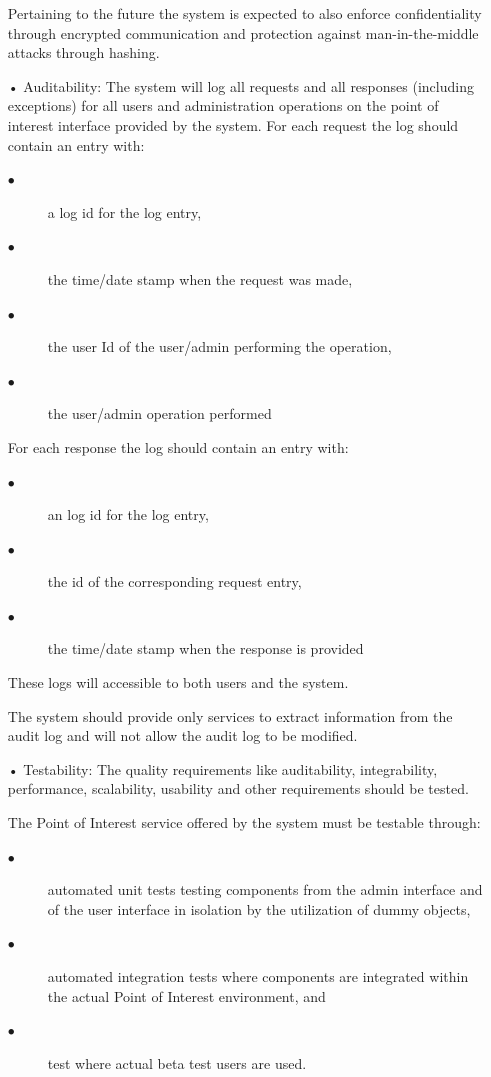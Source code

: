 \documentclass[runningheads,a4paper]{article}
\begin{document}
\begin{enumerate}
Pertaining to the future the system is expected to also enforce confidentiality through encrypted communication and protection against man-in-the-middle attacks through hashing.

\item[•]Auditability: The system will log all requests and all responses (including exceptions) for all users and administration operations on the point of interest interface provided by the system.
For each request the log should contain an entry with:
\begin{description}
\item[$\bullet$] a log id for the log entry,
\item[$\bullet$] the time/date stamp when the request was made,
\item[$\bullet$] the user Id of the user/admin performing the operation,
\item[$\bullet$] the user/admin operation performed 
\end{description}

For each response the log should contain an entry with:
\begin{description}
\item[$\bullet$] an log id for the log entry,
\item[$\bullet$] the id of the corresponding request entry,
\item[$\bullet$] the time/date stamp when the response is provided
\end{description}
These logs will accessible to both users and the system.

The system should provide only services to extract information from the audit log and will not
allow the audit log to be modified.

\item[•]Testability: The quality requirements like auditability, integrability, performance, scalability, usability and other requirements should be tested.

The Point of Interest service offered by the system must be testable through:
\begin{description}
\item[$\bullet$] automated unit tests testing components from the admin interface and of the user interface in isolation by the utilization of dummy objects, 
\item[$\bullet$] automated integration tests where components are integrated within the actual Point of Interest environment, and
\item[$\bullet$] test where actual beta test users are used. 
\end{description}


\end{enumerate}
\end{document}
